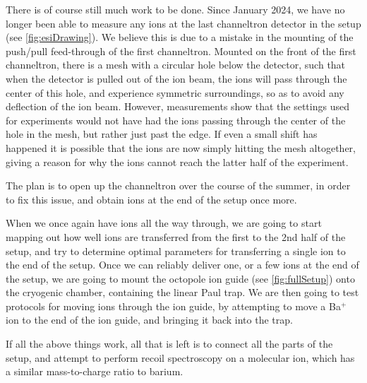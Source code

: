 There is of course still much work to be done.
Since January 2024, we have no longer been able to measure any ions at the last channeltron detector in the setup (see \cref{fig:esiDrawing}). We believe this is due to a mistake in the mounting of the push/pull feed-through of the first channeltron.  Mounted on the front of the first channeltron, there is a mesh with a circular hole below the detector, such that when the detector is pulled out of the ion beam, the ions will pass through the center of this hole, and experience symmetric surroundings, so as to avoid any deflection of the ion beam.
However, measurements show that the settings used for experiments would not have had the ions passing through the center of the hole in the mesh, but rather just past the edge. If even a small shift has happened it is possible that the ions are now simply hitting the mesh altogether, giving a reason for why the ions cannot reach the latter half of the experiment.

The plan is to open up the channeltron over the course of the summer, in order to fix this issue, and obtain ions at the end of the setup once more.

When we once again have ions all the way through, we are going to start mapping out how well ions are transferred from the first to the 2nd half of the setup, and try to determine optimal parameters for transferring a single ion to the end of the setup.
Once we can reliably deliver one, or a few ions at the end of the setup, we are going to mount the octopole ion guide (see \cref{fig:fullSetup}) onto the cryogenic chamber, containing the linear Paul trap. We are then going to test protocols for moving ions through the ion guide, by attempting to move a Ba$^+$ ion to the end of the ion guide, and bringing it back into the trap.

If all the above things work, all that is left is to connect all the parts of the setup, and attempt to perform recoil spectroscopy on a molecular ion, which has a similar mass-to-charge ratio to barium.